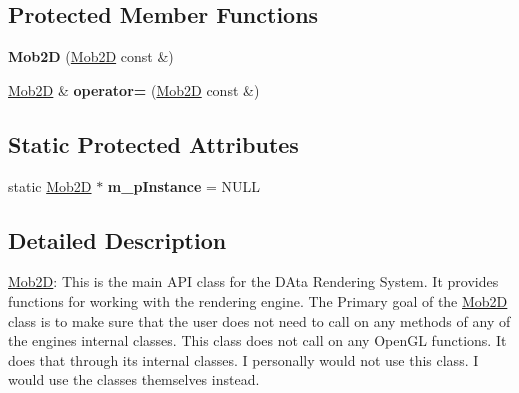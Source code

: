 \subsection*{Protected Member Functions}
\begin{DoxyCompactItemize}
\item 
\hypertarget{classMob2D_a7b16d3c77ee8961d0e097958fca23351}{
{\bfseries Mob2D} (\hyperlink{classMob2D}{Mob2D} const \&)}
\label{classMob2D_a7b16d3c77ee8961d0e097958fca23351}

\item 
\hypertarget{classMob2D_ad20f2c345be31c4dbf84055e180fb022}{
\hyperlink{classMob2D}{Mob2D} \& {\bfseries operator=} (\hyperlink{classMob2D}{Mob2D} const \&)}
\label{classMob2D_ad20f2c345be31c4dbf84055e180fb022}

\end{DoxyCompactItemize}
\subsection*{Static Protected Attributes}
\begin{DoxyCompactItemize}
\item 
\hypertarget{classMob2D_a9f9ca36e30d1bead16a1b2987b3aea4d}{
static \hyperlink{classMob2D}{Mob2D} $\ast$ {\bfseries m\_\-pInstance} = NULL}
\label{classMob2D_a9f9ca36e30d1bead16a1b2987b3aea4d}

\end{DoxyCompactItemize}


\subsection{Detailed Description}
\hyperlink{classMob2D}{Mob2D}: This is the main API class for the DAta Rendering System. It provides functions for working with the rendering engine. The Primary goal of the \hyperlink{classMob2D}{Mob2D} class is to make sure that the user does not need to call on any methods of any of the engines internal classes. This class does not call on any OpenGL functions. It does that through its internal classes. I personally would not use this class. I would use the classes themselves instead. 

